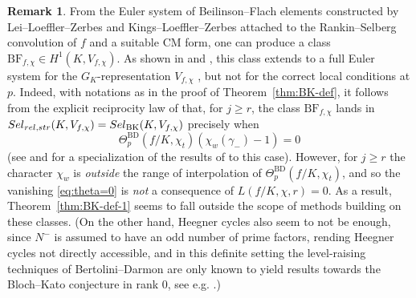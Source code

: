 \documentclass[10pt,letterpaper]{amsart}
\theoremstyle{plain}
\theoremstyle{definition}
\newtheorem{rmk}[thm]{Remark}
\theoremstyle{definition}
\theoremstyle{plain}
\theoremstyle{plain}
\theoremstyle{plain}
\theoremstyle{remark}
\numberwithin{equation}{section}
\newcommand{\Sel}{Sel}
\newcommand{\rH}{H}
\newcommand{\relstr}{{{\rm rel},{\rm str}}}
\DeclareMathOperator{\BD}{BD} %
\def\Sel{{\rm Sel}}
\begin{document}
\begin{rmk}\label{rmk:Heeg-BF}
%
From the Euler system of Beilinson--Flach elements constructed by Lei--Loeffler--Zerbes and Kings--Loeffler--Zerbes \cite{LLZ,KLZ} attached to the Rankin--Selberg convolution of $f$ and a suitable CM form, one can produce a class ${\mathrm{BF}}_{f,\chi}\in\rH^1(K,V_{f,\chi})$. As shown in \cite{LLZ-K} and \cite{BL}, this class extends to a full Euler system for the $G_K$-representation $V_{f,\chi}$ , but not for the correct local conditions at $p$. Indeed, with notations as in the proof of Theorem~\ref{thm:BK-def}, it follows from the explicit reciprocity law of \cite{KLZ} that, for $j\geq r$, the class ${\mathrm{BF}}_{f,\chi}$ lands in $\Sel_{\relstr}(K,V_{f,\chi})=\Sel_{\mathrm{BK}}(K,V_{f,\chi})$ precisely when 
\begin{equation}\label{eq:theta=0}
\Theta_p^{\BD}(f/K,\chi_t)(\chi_w(\gamma_-)-1)=0
\end{equation}
(see \cite[Thm.~2.4]{cas-BF} and \cite[Thm.~3.11]{BL} for a specialization of the results of \cite{KLZ} to this case).  
However, for $j\geq r$ the character $\chi_w$ is \emph{outside} the range of interpolation of $\Theta_p^{\BD}(f/K,\chi_t)$, %
and so the vanishing \eqref{eq:theta=0} is \emph{not} a consequence of  $L(f/K,\chi,r)=0$. As a result,  Theorem~\ref{thm:BK-def-1} seems to fall outside the scope of methods building on these classes.
(On the other hand, Heegner cycles also seem to not be enough, since $N^-$ is assumed to have an odd number of prime factors, rending Heegner cycles not directly accessible, and in this definite setting the level-raising techniques of Bertolini--Darmon \cite{bdIMC} are only known to yield results towards the Bloch--Kato conjecture  in rank $0$, see e.g. \cite{LV-JNT}.) 
\end{rmk}

\end{document}

